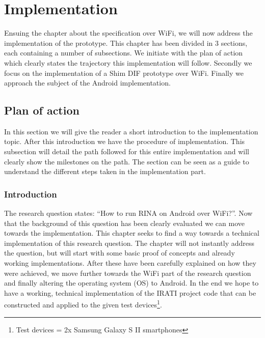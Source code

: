 \chapter{Implementation}

Ensuing the chapter about the specification over WiFi, we will now address the implementation of the prototype. This chapter has been divided in 3 sections, each containing a number of subsections. We initiate with the plan of action which clearly states the trajectory this implementation will follow. Secondly we focus on the implementation of a Shim DIF prototype over WiFi. Finally we approach the subject of the Android implementation. 

\section{Plan of action}


In this section we will give the reader a short introduction to the implementation topic. After this introduction we have the procedure of implementation. This subsection will detail the path followed for this entire implementation and will clearly show the milestones on the path. The section can be seen as a guide to understand the different steps taken in the implementation part. 

\subsection{Introduction}


The research question states: ``How to run RINA on Android over WiFi?''. Now that the background of this question has been clearly evaluated we can move towards the implementation. This chapter seeks to find a way towards a technical implementation of this research question. The chapter will not instantly address the question, but will start with some basic proof of concepts and already working implementations. After these have been carefully explained on how they were achieved, we move further towards the WiFi part of the research question and finally altering the operating system (OS) to Android. 
\npar
In the end we hope to have a working, technical implementation of the IRATI project code that can be constructed and applied to the given test devices\footnote{Test devices = 2x Samsung Galaxy S II smartphones}.

